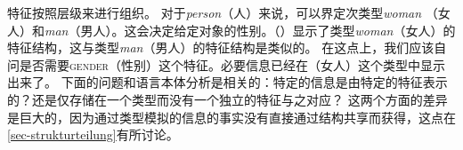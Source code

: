特征按照层级来进行组织。
对于\textit{person}（人）来说，可以界定次类型\textit{woman} （女人）和\textit{man}（男人）。这会决定给定对象的性别。（）显示了类型\textit{woman}（女人）的特征结构，这与类型\textit{man}（男人）的特征结构是类似的。
\ea
{}
\z
在这点上，我们应该自问是否需要\textsc{gender}（性别）这个特征。必要信息已经在（女人）这个类型中显示出来了。
下面的问题和语言本体分析是相关的：特定的信息是由特定的特征表示的？还是仅存储在一个类型而没有一个独立的特征与之对应？
这两个方面的差异是巨大的，因为通过类型模拟的信息的事实没有直接通过结构共享而获得，这点在\ref{sec-strukturteilung}有所讨论。

